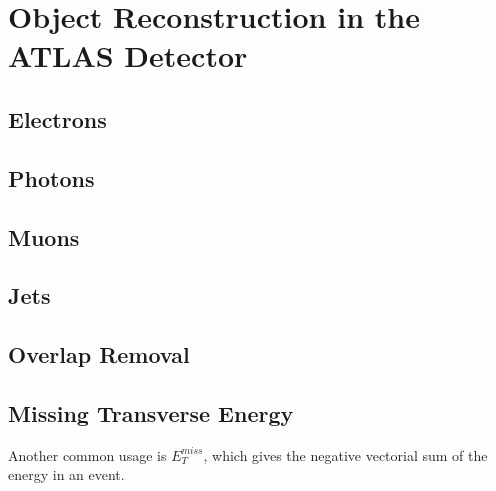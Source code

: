 \chapter{Object Reconstruction in the ATLAS Detector} %

\label{ch:reconstruction} 


\section{Electrons}
\label{sec:reco_electrons}
\section{Photons}
\label{sec:reco_photons}
\section{Muons}
\label{sec:reco_muons}
\section{Jets}
\label{sec:reco_jets}
\section{Overlap Removal}
\label{sec:reco_or}
\section{Missing Transverse Energy}
\label{sec:reco_met}
Another common usage is $E_T^{miss}$, which gives the negative vectorial sum of the energy in an event. 



